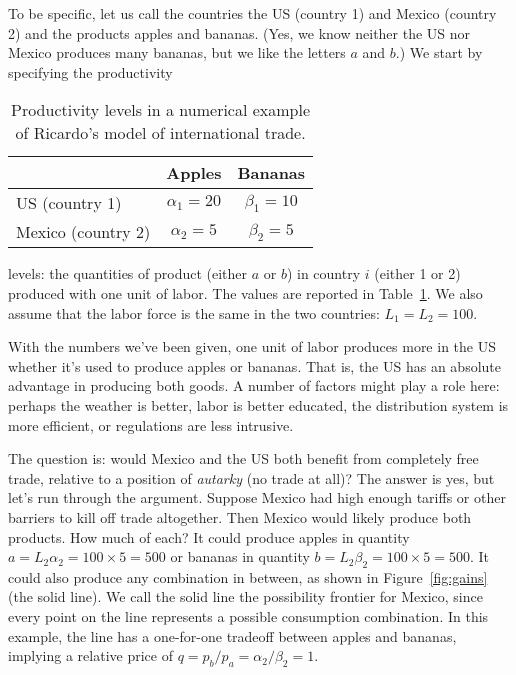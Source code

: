 \documentclass[letterpaper,12pt]{article}
\begin{document}
To be specific, let us call the countries the US (country 1) and
Mexico (country 2) and the products apples and bananas.  (Yes, we
know neither the US nor Mexico produces many bananas, but we like
the letters $a$ and $b$.)  We start by specifying the productivity
%
\begin{table}[h]
\begin{center}

\begin{tabular}{lcc}
\toprule
                    &        Apples       &      Bananas    \\%

\midrule
US (country 1)      &   $\alpha_{1}=20$   & $\beta_{1}=10$  \\%
Mexico (country 2)  &   $\alpha_{2}=5$    & $\beta_{2}=5$   \\%
\bottomrule
\end{tabular}
\caption{Productivity levels in a numerical example of
Ricardo's model of international trade.}
\label{tab:prod}
\end{center}
\end{table}
levels: the quantities of product (either $a$ or $b$) in country
$i$ (either 1 or 2) produced with one unit of labor. The values
are reported in Table~\ref{tab:prod}. We also assume that the
labor force is the same in the two countries: $L_{1}=L_{2}=100$.

With the numbers we've been given, one unit of labor produces more in the US
whether it's used to produce apples or bananas. That is, the US
has an {absolute advantage} in producing both goods. A
number of factors might play a role here: perhaps the weather is
better, labor is better educated, the distribution system is
more efficient, or regulations are less intrusive.


The question is: would Mexico and the US both benefit from
completely free trade, relative to a position of \textit{autarky}
(no trade at all)? The answer is yes, but let's run through
the argument. Suppose Mexico had high enough tariffs or other
barriers to kill off trade altogether. Then Mexico would likely
produce both products. How much of each? It could produce apples
in quantity $a=L_{2}\alpha_{2} = 100\times 5 = 500$ or bananas in
quantity $b=L_{2}\beta_{2} = 100\times 5 = 500$. It could also
produce any combination in between, as shown in
Figure~\ref{fig:gains} (the solid line). We call the solid line
the possibility frontier for Mexico, since every point on the line
represents a possible consumption combination. In this example,
the line has a one-for-one tradeoff between apples and bananas,
implying a relative price of $ q=p_{b}/p_{a} =
\alpha_{2}/\beta_{2} = 1$.
\end{document}
